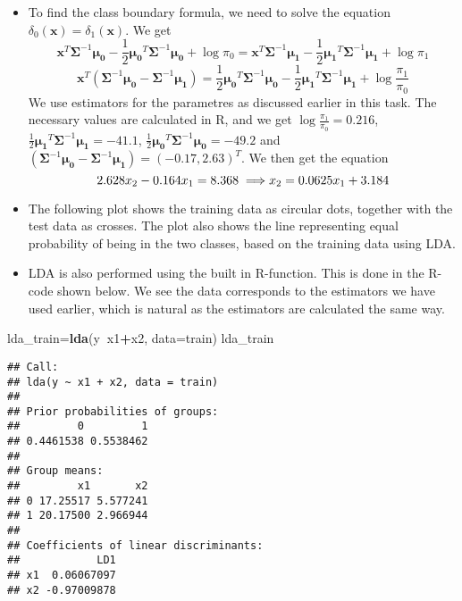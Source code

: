 \documentclass[]{article}
\newenvironment{Shaded}{\begin{snugshade}}{\end{snugshade}}
\newcommand{\KeywordTok}[1]{\textcolor[rgb]{0.13,0.29,0.53}{\textbf{#1}}}
\newcommand{\DataTypeTok}[1]{\textcolor[rgb]{0.13,0.29,0.53}{#1}}
\newcommand{\OperatorTok}[1]{\textcolor[rgb]{0.81,0.36,0.00}{\textbf{#1}}}
\newcommand{\NormalTok}[1]{#1}
\begin{document}
\begin{itemize}
\item
  To find the class boundary formula, we need to solve the equation
  \(\delta_0(\boldsymbol{x})=\delta_1(\boldsymbol{x})\). We get
  \[\boldsymbol{x}^T\boldsymbol{\Sigma}^{-1}\boldsymbol{\mu_0}- \frac{1}{2}\boldsymbol{\mu_0}^T\boldsymbol{\Sigma}^{-1}\boldsymbol{\mu_0} + \log{\pi_0}=\boldsymbol{x}^T\boldsymbol{\Sigma}^{-1}\boldsymbol{\mu_1}- \frac{1}{2}\boldsymbol{\mu_1}^T\boldsymbol{\Sigma}^{-1}\boldsymbol{\mu_1} + \log{\pi_1}\]
  \[\boldsymbol{x}^T(\boldsymbol{\Sigma}^{-1}\boldsymbol{\mu_0}-\boldsymbol{\Sigma}^{-1}\boldsymbol{\mu_1})=\frac{1}{2}\boldsymbol{\mu_0}^T\boldsymbol{\Sigma}^{-1}\boldsymbol{\mu_0} - \frac{1}{2}\boldsymbol{\mu_1}^T\boldsymbol{\Sigma}^{-1}\boldsymbol{\mu_1} + \log{\frac{\pi_1}{\pi_0}}\]
  We use estimators for the parametres as discussed earlier in this
  task. The necessary values are calculated in R, and we get
  \(\log{\frac{\pi_1}{\pi_0}}=0.216\),
  \(\frac{1}{2}\boldsymbol{\mu_1}^T\boldsymbol{\Sigma}^{-1}\boldsymbol{\mu_1}=-41.1\),
  \(\frac{1}{2}\boldsymbol{\mu_0}^T\boldsymbol{\Sigma}^{-1}\boldsymbol{\mu_0}=-49.2\)
  and
  \((\boldsymbol{\Sigma}^{-1}\boldsymbol{\mu_0}-\boldsymbol{\Sigma}^{-1}\boldsymbol{\mu_1})=(-0.17, 2.63)^T\).
  We then get the equation
  \[2.628x_2-0.164x_1=8.368 \implies \\ x_2 = 0.0625x_1 + 3.184\]
\item
  The following plot shows the training data as circular dots, together
  with the test data as crosses. The plot also shows the line
  representing equal probability of being in the two classes, based on
  the training data using LDA.
\item
  LDA is also performed using the built in R-function. This is done in
  the R-code shown below. We see the data corresponds to the estimators
  we have used earlier, which is natural as the estimators are
  calculated the same way.
\end{itemize}

\begin{Shaded}
\begin{Highlighting}[]
\NormalTok{lda_train=}\KeywordTok{lda}\NormalTok{(y}\OperatorTok{~}\NormalTok{x1}\OperatorTok{+}\NormalTok{x2, }\DataTypeTok{data=}\NormalTok{train)}
\NormalTok{lda_train}
\end{Highlighting}
\end{Shaded}

\begin{verbatim}
## Call:
## lda(y ~ x1 + x2, data = train)
## 
## Prior probabilities of groups:
##         0         1 
## 0.4461538 0.5538462 
## 
## Group means:
##         x1       x2
## 0 17.25517 5.577241
## 1 20.17500 2.966944
## 
## Coefficients of linear discriminants:
##            LD1
## x1  0.06067097
## x2 -0.97009878
\end{verbatim}
\end{document}
